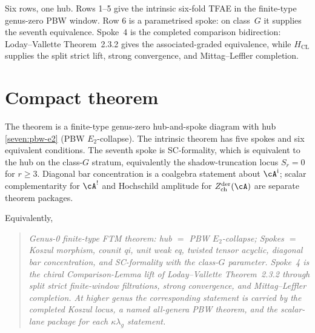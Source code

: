 Six rows, one hub.  Rows 1--5 give the intrinsic six-fold TFAE in
the finite-type genus-zero PBW window.  Row 6 is a parametrised spoke:
on class~$G$ it supplies the seventh equivalence.  Spoke~4 is the
completed comparison bidirection: Loday--Vallette Theorem~2.3.2 gives
the associated-graded equivalence, while $H_{\mathrm{CL}}$ supplies
the split strict lift, strong convergence, and Mittag--Leffler
completion.

\section{Compact theorem}
\label{sec:ftm-compact-theorem}

The theorem is a finite-type genus-zero hub-and-spoke diagram with
hub \ref{seven:pbw-e2} (PBW $E_2$-collapse).  The intrinsic theorem
has five spokes and six equivalent conditions.  The seventh spoke is
SC-formality, which is equivalent to the hub on the class-$G$
stratum, equivalently the shadow-truncation locus
$S_r=0$ for $r\geq 3$.  Diagonal bar concentration is a coalgebra
statement about $\cA^{\mathrm i}$; scalar complementarity for
$\cA^!$ and Hochschild amplitude for
$Z^{\mathrm{der}}_{\mathrm{ch}}(\cA)$ are separate theorem packages.

Equivalently,
\begin{quote}
\textit{Genus-0 finite-type FTM theorem: hub $=$ PBW
$E_2$-collapse; Spokes $=$ Koszul morphism, counit qi, unit weak eq,
twisted tensor acyclic, diagonal bar concentration, and
SC-formality with the class-$G$ parameter.  Spoke~4 is the chiral
Comparison-Lemma lift of Loday--Vallette Theorem~2.3.2 through split
strict finite-window filtrations, strong convergence, and
Mittag--Leffler completion.  At higher genus the corresponding
statement is carried by the completed Koszul locus, a named
all-genera PBW theorem, and the scalar-lane package for each
$\kappa\lambda_g$ statement.}
\end{quote}
